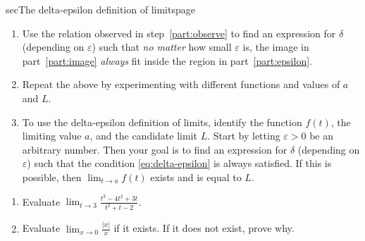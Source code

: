 \documentclass[../main.tex]{subfiles}
\begin{document}
\begin{outline}{sec}{The delta-epsilon definition of limits}{page}
\begin{enumerate}
    \item Use the relation observed in step~\ref{part:observe} to find an expression for \(\delta\) (depending on \(\varepsilon\)) such that \emph{no matter} how small \(\varepsilon\) is, the image in part~\eqref{part:image} \emph{always} fit inside the region in part~\eqref{part:epsilon}.
    \item Repeat the above by experimenting with different functions and values of \(a\) and \(L\).
    \item To use the delta-epsilon definition of limits, identify the function \(f(t)\), the limiting value \(a\), and the candidate limit \(L\). Start by letting \(\varepsilon > 0\) be an arbitrary number. Then your goal is to find an expression for \(\delta\) (depending on \(\varepsilon\)) such that the condition \eqref{eq:delta-epsilon} is always satisfied. If this is possible, then \({\lim_{t \to a}} f(t)\) exists and is equal to \(L\).
  \end{enumerate}
\end{outline}

\begin{enumerate}
  \item Evaluate \({\lim_{t \to 3}} \frac{t^{3} - 4 t^{2} + 3t}{t^{2} + t - 2}\).
  \item Evaluate \(\lim_{x\rightarrow 0} \frac{|x|}{x}\) if it exists. If it does not exist, prove why.
\end{enumerate}
\end{document}
